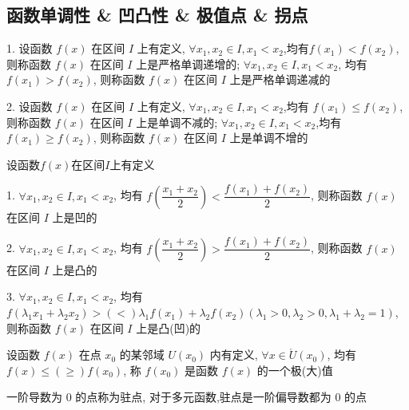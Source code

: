 \subsection{函数单调性 \& 凹凸性 \& 极值点 \& 拐点}
\begin{definition}[单调性]
	1. 设函数 $f(x)$ 在区间 $I$ 上有定义, $\forall x_{1},x_{2}\in I,x_{1}<x_{2}$,均有$f(x_{1}) < f(x_{2})$,
	则称函数 $f(x)$ 在区间 $I$ 上是严格单调递增的;
	$\forall x_{1},x_{2}\in I,x_{1}<x_{2}$, 均有 $f(x_{1})>f(x_{2})$, 
	则称函数 $f(x)$ 在区间 $I$ 上是严格单调递减的

	2. 设函数 $f(x)$ 在区间 $I$ 上有定义, $\forall x_{1},x_{2}\in I,x_{1}<x_{2}$,均有 $f(x_{1})\leq f(x_{2})$,
	则称函数 $f(x)$ 在区间 $I$ 上是单调不减的; $\forall x_{1},x_{2}\in I,x_{1}<x_{2}$,均有 $f(x_{1})\geq f(x_{2})$,
	则称函数 $f(x)$ 在区间 $I$ 上是单调不增的
\end{definition}

\begin{definition}[凹凸性]
	设函数$f(x)$在区间$I$上有定义
	
	1. $\forall x_{1},x_{2}\in I,x_{1}<x_{2}$, 均有 $f(\dfrac{x_{1}+x_{2}}{2}) < \dfrac{f(x_{1})+f(x_{2})}{2}$, 则称函数 $f(x)$ 在区间 $I$ 上是凹的
	
	2. $\forall x_{1},x_{2}\in I,x_{1}<x_{2}$, 均有 $f(\dfrac{x_{1}+x_{2}}{2}) > \dfrac{f(x_{1})+f(x_{2})}{2}$, 则称函数 $f(x)$ 在区间 $I$ 上是凸的

	3. $\forall x_{1},x_{2}\in I,x_{1}<x_{2}$, 均有 $f(\lambda_{1}x_{1} +\lambda_{2} x_{2}) >(<)\lambda_{1}f(x_{1}) +\lambda_{2}f(x_{2})(\lambda_{1}>0, \lambda_{2}>0, \lambda_{1}+\lambda_{2} = 1)$,
	则称函数 $f(x)$ 在区间 $I$ 上是凸(凹)的
\end{definition}

\begin{definition}[极值点]
	设函数 $f(x)$ 在点 $x_{0}$ 的某邻域 $U(x_{0})$ 内有定义, $\forall x\in \mathring{U}(x_{0})$, 
	均有 $f(x) \leq (\geq)f(x_{0})$, 称 $f(x_{0})$ 是函数 $f(x)$ 的一个极(大)值
\end{definition}
\begin{definition}[驻点]
	一阶导数为 $0$ 的点称为驻点, 对于多元函数,驻点是一阶偏导数都为 $0$ 的点
\end{definition}

